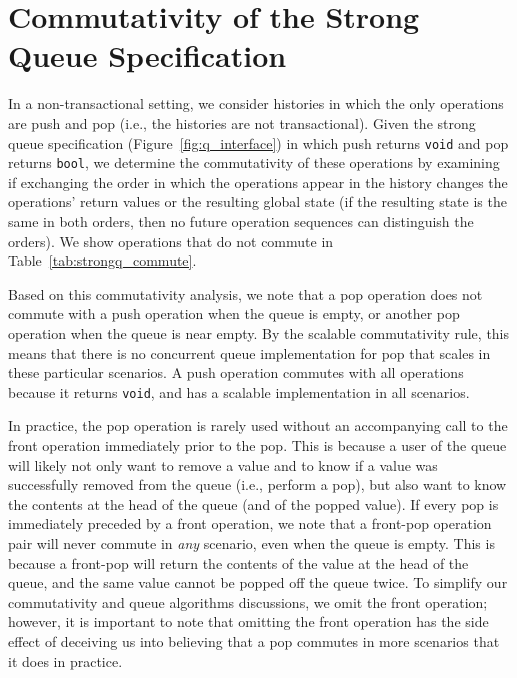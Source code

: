 \section{Commutativity of the Strong Queue Specification} 

In a non-transactional setting, we consider histories in which the only operations are push and pop (i.e., the histories are not transactional). Given the strong queue specification (Figure~\ref{fig:q_interface}) in which push returns \texttt{void} and pop returns \texttt{bool}, we determine the commutativity of these operations by examining if exchanging the order in which the operations appear in the history changes the operations' return values or the resulting global state (if the resulting state is the same in both orders, then no future operation sequences can distinguish the orders). We show operations that do not commute in Table~\ref{tab:strongq_commute}.

Based on this commutativity analysis, we note that a pop operation does not commute with a push operation when the queue is empty, or another pop operation when the queue is near empty. By the scalable commutativity rule, this means that there is no concurrent queue implementation for pop that scales in these particular scenarios. A push operation commutes with all operations because it returns \texttt{void}, and has a scalable implementation in all scenarios.

In practice, the pop operation is rarely used without an accompanying call to the front operation immediately prior to the pop. This is because a user of the queue will likely not only want to remove a value and to know if a value was successfully removed from the queue (i.e., perform a pop), but also want to know the contents at the head of the queue (and of the popped value). If every pop is immediately preceded by a front operation, we note that a front-pop operation pair will never commute in \emph{any} scenario, even when the queue is empty. This is because a front-pop will return the contents of the value at the head of the queue, and the same value cannot be popped off the queue twice. To simplify our commutativity and queue algorithms discussions, we omit the front operation; however, it is important to note that omitting the front operation has the side effect of deceiving us into believing that a pop commutes in more scenarios that it does in practice.

